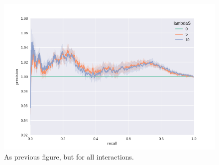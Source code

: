 \documentclass[11pt]{article}
\begin{document}
\begin{figure}
\begin{center}
  \includegraphics[scale=0.45]{wat7.png}
  \caption{\label{fig:figure1} As previous figure, but for all interactions.}
  \end{center}
\end{figure}




\end{document}
